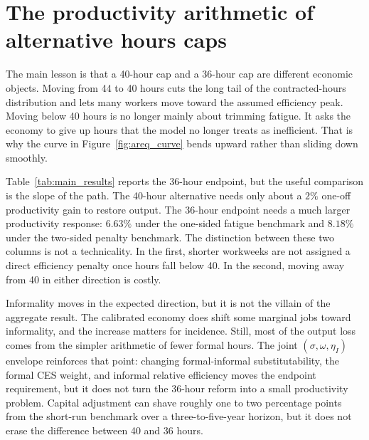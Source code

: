 
\section{The productivity arithmetic of alternative hours caps}\label{sec:results}

The main lesson is that a 40-hour cap and a 36-hour cap are different economic objects. Moving from 44 to 40 hours cuts the long tail of the contracted-hours distribution and lets many workers move toward the assumed efficiency peak. Moving below 40 hours is no longer mainly about trimming fatigue. It asks the economy to give up hours that the model no longer treats as inefficient. That is why the curve in Figure~\ref{fig:areq_curve} bends upward rather than sliding down smoothly.

Table~\ref{tab:main_results} reports the 36-hour endpoint, but the useful comparison is the slope of the path. The 40-hour alternative needs only about a $2\%$ one-off productivity gain to restore output. The 36-hour endpoint needs a much larger productivity response: $6.63\%$ under the one-sided fatigue benchmark and $8.18\%$ under the two-sided penalty benchmark. The distinction between these two columns is not a technicality. In the first, shorter workweeks are not assigned a direct efficiency penalty once hours fall below 40. In the second, moving away from 40 in either direction is costly.

Informality moves in the expected direction, but it is not the villain of the aggregate result. The calibrated economy does shift some marginal jobs toward informality, and the increase matters for incidence. Still, most of the output loss comes from the simpler arithmetic of fewer formal hours. The joint $(\sigma,\omega,\eta_I)$ envelope reinforces that point: changing formal-informal substitutability, the formal CES weight, and informal relative efficiency moves the endpoint requirement, but it does not turn the 36-hour reform into a small productivity problem. Capital adjustment can shave roughly one to two percentage points from the short-run benchmark over a three-to-five-year horizon, but it does not erase the difference between 40 and 36 hours.

